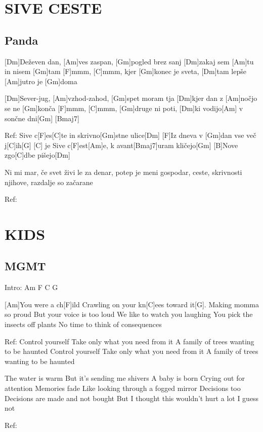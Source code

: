 \documentclass{article}
\begin{document}
\section*{SIVE CESTE}
%
\subsection*{Panda}
\begin{guitar}

	[Dm]Deževen dan, [Am]ves zaspan, [Gm]pogled brez sanj
	[Dm]zakaj sem [Am]tu in nisem [Gm]tam
	[F]mmm, [C]mmm, kjer [Gm]konec je sveta,
	[Dm]tam lepše [Am]jutro je [Gm]doma
	\linebreak

	[Dm]Sever-jug, [Am]vzhod-zahod, [Gm]spet moram tja
	[Dm]kjer dan z [Am]nočjo se ne [Gm]konča
	[F]mmm, [C]mmm, [Gm]druge ni poti,
	[Dm]ki vodijo[Am] v sončne dni[Gm] [Bmaj7]
	\linebreak

	Ref:
	Sive c[F]es[C]te in skrivno[Gm]stne ulice[Dm]
	[F]Iz dneva v [Gm]dan vse več j[C]ih[G] [C] je
	Sive c[F]est[Am]e, k avant[Bmaj7]uram kličejo[Gm]
	[B]Nove zgo[C]dbe pišejo[Dm]
	\linebreak

	Ni mi mar, če svet živi le za denar,
	potep je meni gospodar,
	ceste, skrivnosti njihove,
	razdalje so začarane
	\linebreak

	Ref:

\end{guitar}

\section*{KIDS}
%
\subsection*{MGMT}
\begin{guitar}
	Intro: Am F C G
	
	[Am]You were a ch[F]ild
	Crawling on your kn[C]ees toward it[G]. 
	Making momma so proud
	But your voice is too loud
	We like to watch you laughing
	You pick the insects off plants
	No time to think of consequences
	
	
	Ref:
	Control yourself
	Take only what you need from it
	A family of trees wanting to be haunted
	Control yourself
	Take only what you need from it
	A family of trees wanting to be haunted
	
	
	The water is warm
	But it's sending me shivers
	A baby is born
	Crying out for attention
	Memories fade
	Like looking through a fogged mirror
	Decisions too
	Decisions are made and not bought
	But I thought this wouldn't hurt a lot
	I guess not
	
	Ref:

\end{guitar}
\end{document}
